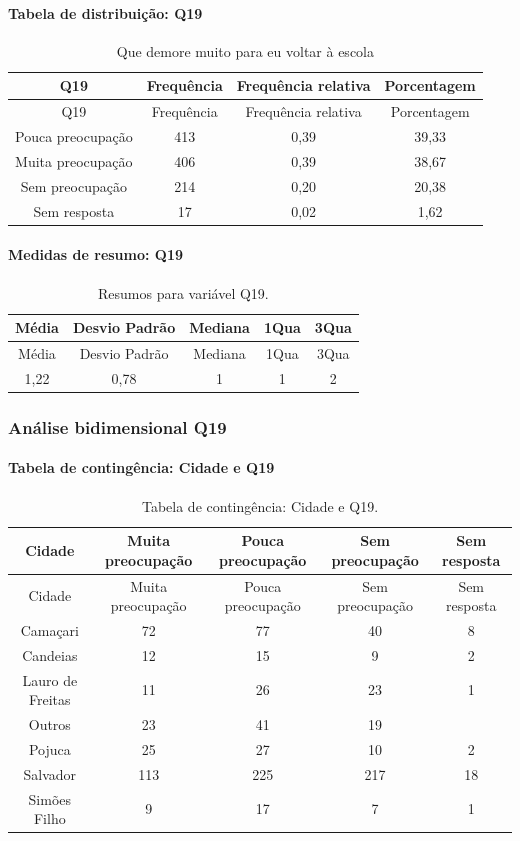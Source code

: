 \documentclass[]{article}
\let\oldparagraph\paragraph
\renewcommand{\paragraph}[1]{\oldparagraph{#1}\mbox{}}
\begin{document}
\hypertarget{tabela-de-distribuiuxe7uxe3o-q19}{%
\paragraph{Tabela de distribuição: Q19}\label{tabela-de-distribuiuxe7uxe3o-q19}}

\begin{longtable}[]{@{}cccc@{}}
\caption{\label{tab:unnamed-chunk-305}Que demore muito para eu voltar à escola}\tabularnewline
\toprule
Q19 & Frequência & Frequência relativa & Porcentagem\tabularnewline
\midrule
\endfirsthead
\toprule
Q19 & Frequência & Frequência relativa & Porcentagem\tabularnewline
\midrule
\endhead
Pouca preocupação & 413 & 0,39 & 39,33\tabularnewline
Muita preocupação & 406 & 0,39 & 38,67\tabularnewline
Sem preocupação & 214 & 0,20 & 20,38\tabularnewline
Sem resposta & 17 & 0,02 & 1,62\tabularnewline
\bottomrule
\end{longtable}

\hypertarget{medidas-de-resumo-q19}{%
\paragraph{Medidas de resumo: Q19}\label{medidas-de-resumo-q19}}

\begin{longtable}[]{@{}ccccc@{}}
\caption{\label{tab:unnamed-chunk-306}Resumos para variável Q19.}\tabularnewline
\toprule
Média & Desvio Padrão & Mediana & 1Qua & 3Qua\tabularnewline
\midrule
\endfirsthead
\toprule
Média & Desvio Padrão & Mediana & 1Qua & 3Qua\tabularnewline
\midrule
\endhead
1,22 & 0,78 & 1 & 1 & 2\tabularnewline
\bottomrule
\end{longtable}

\cleardoublepage

\hypertarget{anuxe1lise-bidimensional-q19}{%
\subsubsection{Análise bidimensional Q19}\label{anuxe1lise-bidimensional-q19}}

\hypertarget{tabela-de-continguxeancia-cidade-e-q19}{%
\paragraph{Tabela de contingência: Cidade e Q19}\label{tabela-de-continguxeancia-cidade-e-q19}}

\begin{longtable}[]{@{}ccccc@{}}
\caption{\label{tab:unnamed-chunk-307}Tabela de contingência: Cidade e Q19.}\tabularnewline
\toprule
Cidade & Muita preocupação & Pouca preocupação & Sem preocupação & Sem resposta\tabularnewline
\midrule
\endfirsthead
\toprule
Cidade & Muita preocupação & Pouca preocupação & Sem preocupação & Sem resposta\tabularnewline
\midrule
\endhead
Camaçari & 72 & 77 & 40 & 8\tabularnewline
Candeias & 12 & 15 & 9 & 2\tabularnewline
Lauro de Freitas & 11 & 26 & 23 & 1\tabularnewline
Outros & 23 & 41 & 19 &\tabularnewline
Pojuca & 25 & 27 & 10 & 2\tabularnewline
Salvador & 113 & 225 & 217 & 18\tabularnewline
Simões Filho & 9 & 17 & 7 & 1\tabularnewline
\bottomrule
\end{longtable}
\end{document}
